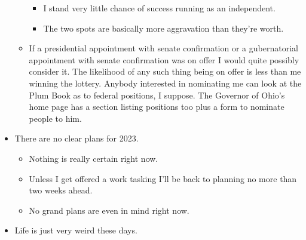 \begin{itemize}
\begin{itemize}
    \begin{itemize}
    \tightlist
    \item
      I stand very little chance of success running as an independent.
    \item
      The two spots are basically more aggravation than they're worth.
    \end{itemize}
  \item
    If a presidential appointment with senate confirmation or a
    gubernatorial appointment with senate confirmation was on offer I
    would quite possibly consider it. The likelihood of any such thing
    being on offer is less than me winning the lottery. Anybody
    interested in nominating me can look at the Plum Book as to federal
    positions, I suppose. The Governor of Ohio's home page has a section
    listing positions too plus a form to nominate people to him.
  \end{itemize}
\item
  There are no clear plans for 2023.

  \begin{itemize}
  \tightlist
  \item
    Nothing is really certain right now.
  \item
    Unless I get offered a work tasking I'll be back to planning no more
    than two weeks ahead.
  \item
    No grand plans are even in mind right now.
  \end{itemize}
\item
  Life is just very weird these days.
\end{itemize}

